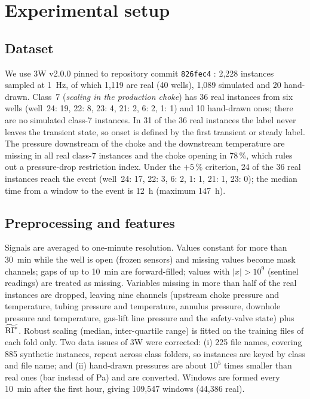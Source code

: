\section{Experimental setup}\label{sec:setup}

\subsection{Dataset}\label{sec:data}

We use 3W v2.0.0 \citep{vargas2026} pinned to repository commit \texttt{826fec4} \citep{petrobras3w}: 2,228
instances sampled at 1~Hz, of which 1,119 are real (40 wells), 1,089 simulated and 20 hand-drawn. Class~7
(\emph{scaling in the production choke}) has 36 real instances from six wells (well~24: 19, 22: 8,
23: 4, 21: 2, 6: 2, 1: 1) and 10 hand-drawn ones; there are no simulated class-7 instances. In 31 of the
36 real instances the label never leaves the transient state, so onset is defined by the first transient
or steady label. The pressure downstream of the choke and the downstream temperature are missing in all
real class-7 instances and the choke opening in 78\,\%, which rules out a pressure-drop restriction
index. Under the $+5\,\%$ criterion, 24 of the 36 real instances reach the event (well~24: 17, 22: 3,
6: 2, 1: 1, 21: 1, 23: 0); the median time from a window to the event is 12~h (maximum 147~h).

\subsection{Preprocessing and features}

Signals are averaged to one-minute resolution. Values constant for more than 30~min while the well is
open (frozen sensors) and missing values become mask channels; gaps of up to 10~min are forward-filled;
values with $|x|>10^9$ (sentinel readings) are treated as missing. Variables missing in more than half of
the real instances are dropped, leaving nine channels (upstream choke pressure and temperature, tubing
pressure and temperature, annulus pressure, downhole pressure and temperature, gas-lift line pressure and
the safety-valve state) plus $\widetilde{\mathrm{RI}^{*}}$. Robust scaling (median, inter-quartile range) is fitted on
the training files of each fold only. Two data issues of 3W were corrected: (i) 225 file names, covering
885 synthetic instances, repeat across class folders, so instances are keyed by class and file name; and
(ii) hand-drawn pressures are about $10^5$ times smaller than real ones (bar instead of Pa) and are
converted. Windows are formed every 10~min after the first hour, giving 109,547 windows (44,386 real).

